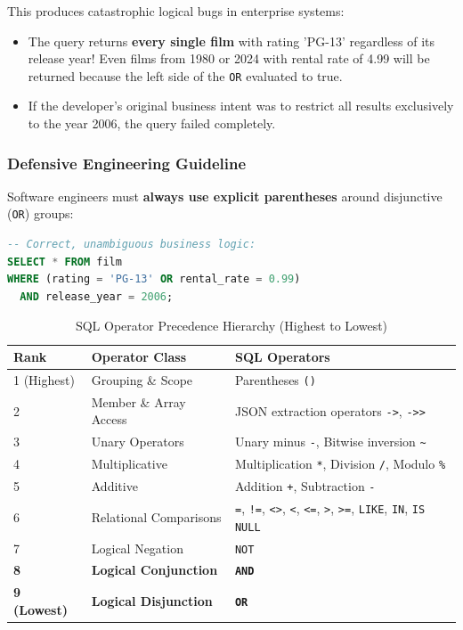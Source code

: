 \documentclass[10pt,journal,compsoc,onecolumn]{IEEEtran}
\begin{document}
This produces catastrophic logical bugs in enterprise systems:
\begin{itemize}
    \item The query returns \textbf{every single film} with rating 'PG-13' regardless of its release year! Even films from 1980 or 2024 with rental rate of 4.99 will be returned because the left side of the \texttt{OR} evaluated to true.
    \item If the developer's original business intent was to restrict all results exclusively to the year 2006, the query failed completely.
\end{itemize}

\subsubsection{Defensive Engineering Guideline}
Software engineers must \textbf{always use explicit parentheses} around disjunctive (\texttt{OR}) groups:
\begin{lstlisting}[language=SQL]
-- Correct, unambiguous business logic:
SELECT * FROM film 
WHERE (rating = 'PG-13' OR rental_rate = 0.99) 
  AND release_year = 2006;
\end{lstlisting}

\begin{table}[htbp]
\caption{SQL Operator Precedence Hierarchy (Highest to Lowest)}
\label{tab:precedence}
\centering
\begin{tabular}{lll}
\toprule
\textbf{Rank} & \textbf{Operator Class} & \textbf{SQL Operators} \\
\midrule
1 (Highest) & Grouping \& Scope & Parentheses \texttt{()} \\
2 & Member \& Array Access & JSON extraction operators \texttt{->}, \texttt{->>} \\
3 & Unary Operators & Unary minus \texttt{-}, Bitwise inversion \texttt{\~{}} \\
4 & Multiplicative & Multiplication \texttt{*}, Division \texttt{/}, Modulo \texttt{\%} \\
5 & Additive & Addition \texttt{+}, Subtraction \texttt{-} \\
6 & Relational Comparisons & \texttt{=}, \texttt{!=}, \texttt{<>}, \texttt{<}, \texttt{<=}, \texttt{>}, \texttt{>=}, \texttt{LIKE}, \texttt{IN}, \texttt{IS NULL} \\
7 & Logical Negation & \texttt{NOT} \\
\textbf{8} & \textbf{Logical Conjunction} & \textbf{\texttt{AND}} \\
\textbf{9 (Lowest)} & \textbf{Logical Disjunction} & \textbf{\texttt{OR}} \\
\bottomrule
\end{tabular}
\end{table}
\end{document}
